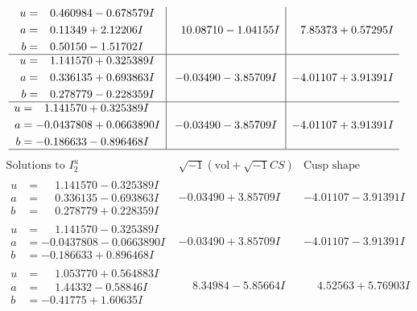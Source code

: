 \documentclass[1p]{elsarticle_modified}
\theoremstyle{definition}
\newcommand{\I}{\sqrt{-1}}
\begin{document}
$$\begin{array}{c|c|c}
\begin{aligned}
u &= \phantom{-}0.460984 - 0.678579 I \\
a &= \phantom{-}0.11349 + 2.12206 I \\
b &= \phantom{-}0.50150 - 1.51702 I\end{aligned}
 & \phantom{-}10.08710 - 1.04155 I & \phantom{-}7.85373 + 0.57295 I \\ \hline\begin{aligned}
u &= \phantom{-}1.141570 + 0.325389 I \\
a &= \phantom{-}0.336135 + 0.693863 I \\
b &= \phantom{-}0.278779 - 0.228359 I\end{aligned}
 & -0.03490 - 3.85709 I & -4.01107 + 3.91391 I \\ \hline\begin{aligned}
u &= \phantom{-}1.141570 + 0.325389 I \\
a &= -0.0437808 + 0.0663890 I \\
b &= -0.186633 - 0.896468 I\end{aligned}
 & -0.03490 - 3.85709 I & -4.01107 + 3.91391 I\\
 \hline 
 \end{array}$$\newpage$$\begin{array}{c|c|c}  
\text{Solutions to }I^u_{2}& \I (\text{vol} + \sqrt{-1}CS) & \text{Cusp shape}\\
 \hline 
\begin{aligned}
u &= \phantom{-}1.141570 - 0.325389 I \\
a &= \phantom{-}0.336135 - 0.693863 I \\
b &= \phantom{-}0.278779 + 0.228359 I\end{aligned}
 & -0.03490 + 3.85709 I & -4.01107 - 3.91391 I \\ \hline\begin{aligned}
u &= \phantom{-}1.141570 - 0.325389 I \\
a &= -0.0437808 - 0.0663890 I \\
b &= -0.186633 + 0.896468 I\end{aligned}
 & -0.03490 + 3.85709 I & -4.01107 - 3.91391 I \\ \hline\begin{aligned}
u &= \phantom{-}1.053770 + 0.564883 I \\
a &= \phantom{-}1.44332 - 0.58846 I \\
b &= -0.41775 + 1.60635 I\end{aligned}
 & \phantom{-}8.34984 - 5.85664 I & \phantom{-}4.52563 + 5.76903 I \\ \hline\begin{aligned}

\end{aligned}
\end{array}$$
\end{document}
